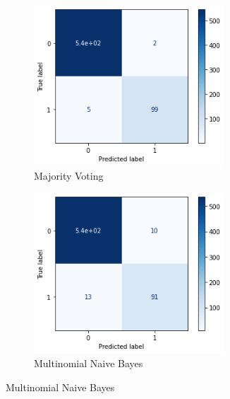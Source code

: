\begin{figure}[H]
    \begin{subfigure}{0.5\textwidth}
        \includegraphics[width=0.9\linewidth, height=6cm]{img/cm/vot.png}
        \caption{Majority Voting}
        \label{fig:vot}
    \end{subfigure}
    \begin{subfigure}{0.5\textwidth}
        \includegraphics[width=0.9\linewidth, height=6cm]{img/cm/mnb.png}
        \caption{Multinomial Naive Bayes}
        \label{fig:mnb}
    \end{subfigure}
\end{figure}

